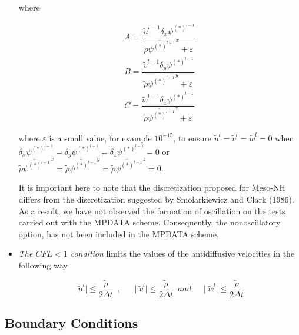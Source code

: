 \begin{itemize}
\noindent where

\begin{eqnarray}
\label{equA}
A =
 \dfrac{ \, \tilde{u}^{l-1} \delta_{x} \psi^{(*)^{l-1}}   }
{ \overline{\tilde{\rho} \psi^{(*)^{l-1}}}^x +\varepsilon }   \\
\label{equB}
B =
 \dfrac{ \, \tilde{v}^{l-1} \delta_{y} \psi^{(*)^{l-1}}   }
{ \overline{\tilde{\rho} \psi^{(*)^{l-1}}}^y +\varepsilon }   \\
\label{equC}
C =
 \dfrac{    \tilde{w}^{l-1} \delta_{z} \psi^{(*)^{l-1}}   }
{ \overline{\tilde{\rho} \psi^{(*)^{l-1}}}^z +\varepsilon }
\end{eqnarray}

\noindent where $\varepsilon$ is a small value, for example $10^{-15}$, to
ensure $\tilde{u}^{l}=\tilde{v}^{l}=\tilde{w}^{l}=0$ when
$\delta_{x} \psi^{(*)^{l-1}}=\delta_{y} \psi^{(*)^{l-1}}=
\delta_{z} \psi^{(*)^{l-1}}=0$ or $\overline{\tilde{\rho} \psi^{(*)^{l-1}}}^x=
\overline{\tilde{\rho} \psi^{(*)^{l-1}}}^y=
\overline{\tilde{\rho} \psi^{(*)^{l-1}}}^z=0$.

It is important here to note that the discretization proposed for Meso-NH
differs from the discretization suggested by Smolarkiewicz and Clark (1986). As a
result, we have not observed the formation of oscillation on the tests carried
out with the MPDATA scheme. Consequently, the nonoscillatory option, has not been
included in the MPDATA scheme.

\item {\em The $CFL<1$ condition } limits the values of the antidiffusive velocities
in the following way

\begin{equation}
\mid\tilde{u}^{l}\mid\leq \dfrac{\tilde{\rho}}{2 \Delta t} \, \, \, , \, \, \, \, \, \, \, \,
\mid\tilde{v}^{l}\mid\leq \dfrac{\tilde{\rho}}{2 \Delta t} \, \, \, and \, \, \, \, \, \, \,
\mid\tilde{w}^{l}\mid\leq \dfrac{\tilde{\rho}}{2 \Delta t}
\end{equation}

\end{itemize}

\subsection{Boundary Conditions}

